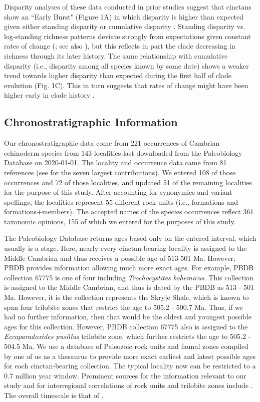 \documentclass{article}
\begin{document}
Disparity analyses of these data conducted in prior studies suggest that cinctans show an ``Early Burst" (Figure 1A) in which disparity is higher than expected given either standing disparity \citep{Hughes2013} or cumulative disparity \citep{Wagner2015} .  Standing disparity vs. log-standing richness patterns deviate strongly from expectations given constant rates of change (\cite*{Jablonski2020}; see also \cite{Wright2017}), but this reflects in part the clade decreasing in richness through its later history.  The same relationship with cumulative disparity (i.e., disparity among all species known by some date) shows a weaker trend towards higher disparity than expected during the first half of clade evolution (Fig. 1C).  This in turn suggests that rates of change might have been higher early in clade history \citep{Foote1996b}. 


\subsection{Chronostratigraphic Information}
Our chronostratigraphic data come from 221 occurrences of Cambrian echinoderm species from 143 localities last downloaded from the Paleobiology Database on 2020-01-01.  The locality and occurrence data came from 81 references (see \cite{Nardin2017, Zamora2009, Chlupac1998, Sprinkle2006, Termier1973, Sprinkle1973} for the seven largest contributions). We entered 108 of those occurrences and 72 of those localities, and updated 51 of the remaining localities for the purpose of this study.  After accounting for synonymies and variant spellings, the localities represent 55 different rock units (i.e., formations and formations+members).  The accepted names of the species occurrences reflect 361 taxonomic opinions, 155 of which we entered for the purposes of this study.

The Paleobiology Database returns ages based only on the entered interval, which usually is a stage. Here, nearly every cinctan-bearing locality is assigned to the Middle Cambrian and thus receives a possible age of 513-501 Ma. However, PBDB provides information allowing much more exact ages. For example, PBDB collection 67775 is one of four including \textit{Trochocystites bohemicus}. This collection is assigned to the Middle Cambrian, and thus is dated by the PBDB as 513 - 501 Ma. However, it is the collection represents the Skryje Shale, which is known to span four trilobite zones that restrict the age to 505.2 - 500.7 Ma. Thus, if we had no further information, then that would be the oldest and youngest possible ages for this collection. However, PBDB collection 67775 also is assigned to the \textit{Eccaparadoxides pusillus} trilobite zone, which further restricts the age to 505.2 - 504.5 Ma. We use a database of Paleozoic rock units and faunal zones compiled by one of us as a thesaurus to provide more exact earliest and latest possible ages for each cinctan-bearing collection. The typical locality now can be restricted to a 0.7 million year window. Prominent sources for the information relevant to our study and for interregional correlations of rock units and trilobite zones include \cite{Alvaro2001, Linan2004, Geyer2006, Geyer2000, Alvaro2007, Geyer2019}.  The overall timescale is that of \cite{Gradstein2012}. 
\end{document}
